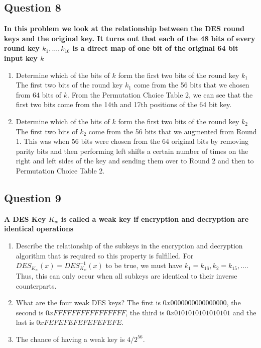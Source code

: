 \documentclass[titlepage]{article}
\begin{document}
{\subsection{Question 8}
\textbf{In this problem we look at the relationship between the DES round keys and the original key. It turns out that each of the 48 bits of every round key \(k_1, \dots, k_16\) is a direct map of one bit of the original 64 bit input key \(k\)}
\begin{enumerate}
    \item Determine which of the bits of \(k\) form the first two bits of the round key \(k_1\)
    The first two bits of the round key \(k_1\) come from the 56 bits that we chosen from 64 bits of \(k\). From the Permutation Choice Table 2, we can see that the first two bits come from the 14th and 17th positions of the 64 bit key.
    \item Determine which of the bits of \(k\) form the first two bits of the round key \(k_2\) The first two bits of \(k_2\) come from the 56 bits that we augmented from Round 1. This was when 56 bits were chosen from the 64 original bits by removing parity bits and then performing left shifts a certain number of times on the right and left sides of the key and sending them over to Round 2 and then to Permutation Choice Table 2.
\end{enumerate}
\subsection{Question 9}
{
\textbf{A DES Key \(K_w\) is called a weak key if encryption and decryption are identical operations}
\begin{enumerate}
    \item Describe the relationship of the subkeys in the encryption and decryption algorithm that is required so this property is fulfilled. For \(DES_{K_w}(x) = DES^{-1}_{K_w}(x)\) to be true, we must have \(k_1 = k_{16}, k_2 = k_{15}, \dots\). Thus, this can only occur when all subkeys are identical to their inverse counterparts.
    \item What are the four weak DES keys? The first is \(0x0000000000000000\), the second is \(0xFFFFFFFFFFFFFFFF\), the third is \(0x0101010101010101\) and the last is \(0xFEFEFEFEFEFEFEFE\).
    \item The chance of having a weak key is \(4 / 2^{56}\).  
\end{enumerate}
}
}
\end{document}
